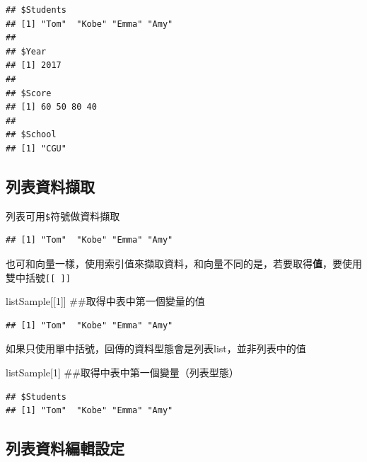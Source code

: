 \documentclass[]{book}
\newenvironment{Shaded}{\begin{snugshade}}{\end{snugshade}}
\newcommand{\DecValTok}[1]{\textcolor[rgb]{0.00,0.00,0.81}{{#1}}}
\newcommand{\NormalTok}[1]{{#1}}
\theoremstyle{definition}
\theoremstyle{definition}
\theoremstyle{remark}
\begin{document}
\begin{verbatim}
## $Students
## [1] "Tom"  "Kobe" "Emma" "Amy" 
## 
## $Year
## [1] 2017
## 
## $Score
## [1] 60 50 80 40
## 
## $School
## [1] "CGU"
\end{verbatim}

\subsection{列表資料擷取}

列表可用\texttt{\$}符號做資料擷取

\begin{Shaded}
\end{Shaded}

\begin{verbatim}
## [1] "Tom"  "Kobe" "Emma" "Amy"
\end{verbatim}

也可和向量一樣，使用索引值來擷取資料，和向量不同的是，若要取得\textbf{值}，要使用雙中括號\texttt{{[}{[}\ {]}{]}}

\begin{Shaded}
\begin{Highlighting}[]
\NormalTok{listSample[[}\DecValTok{1}\NormalTok{]] ##取得中表中第一個變量的值}
\end{Highlighting}
\end{Shaded}

\begin{verbatim}
## [1] "Tom"  "Kobe" "Emma" "Amy"
\end{verbatim}

如果只使用單中括號，回傳的資料型態會是列表list，並非列表中的值

\begin{Shaded}
\begin{Highlighting}[]
\NormalTok{listSample[}\DecValTok{1}\NormalTok{] ##取得中表中第一個變量（列表型態）}
\end{Highlighting}
\end{Shaded}

\begin{verbatim}
## $Students
## [1] "Tom"  "Kobe" "Emma" "Amy"
\end{verbatim}

\subsection{列表資料編輯設定}
\end{document}
